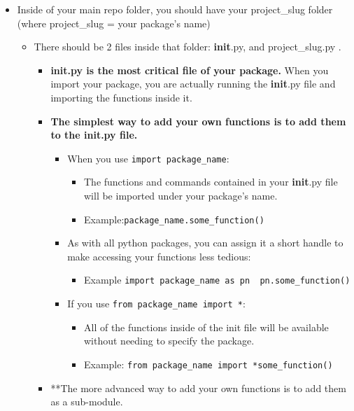 \documentclass[11pt]{article}
\providecommand{\tightlist}{%
      \setlength{\itemsep}{0pt}\setlength{\parskip}{0pt}}
\begin{document}
\begin{itemize}
\tightlist
\item
  Inside of your main repo folder, you should have your project\_slug
  folder (where project\_slug = your package's name)

  \begin{itemize}
  \tightlist
  \item
    There should be 2 files inside that folder: \textbf{init}.py, and
    project\_slug.py .

    \begin{itemize}
    \item
      \textbf{\textbf{init}.py is the most critical file of your
      package.} When you import your package, you are actually running
      the \textbf{init}.py file and importing the functions inside it.
    \item
      \textbf{The simplest way to add your own functions is to add them
      to the \textbf{init}.py file.}

      \begin{itemize}
      \tightlist
      \item
        When you use \texttt{import\ package\_name}:

        \begin{itemize}
        \tightlist
        \item
          The functions and commands contained in your \textbf{init}.py
          file will be imported under your package's name.
        \item
          Example:\texttt{package\_name.some\_function()}
        \end{itemize}
      \item
        As with all python packages, you can assign it a short handle to
        make accessing your functions less tedious:

        \begin{itemize}
        \tightlist
        \item
          Example
          \texttt{import\ package\_name\ as\ pn\ \ pn.some\_function()}
        \end{itemize}
      \item
        If you use \texttt{from\ package\_name\ import\ *}:

        \begin{itemize}
        \item
          All of the functions inside of the init file will be available
          without needing to specify the package.
        \item
          Example:
          \texttt{from\ package\_name\ import\ *}\texttt{some\_function()}
        \end{itemize}
      \end{itemize}
    \item
      **The more advanced way to add your own functions is to add them
      as a sub-module.


\end{itemize}
\end{itemize}
\end{itemize}
\end{document}

